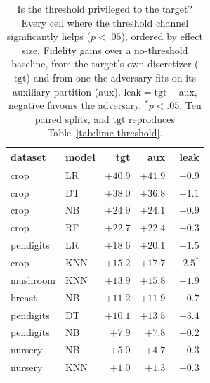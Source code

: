 \documentclass[sigconf,anonymous,review]{acmart}
\begin{document}
\begin{table}[t]
\centering
\caption{Is the threshold privileged to the target? Every cell where the threshold channel
significantly helps ($p{<}.05$), ordered by effect size. Fidelity gains over a no-threshold baseline,
from the target's own discretizer ($\text{tgt}$) and from one the adversary fits on its auxiliary
partition ($\text{aux}$). $\text{leak}=\text{tgt}-\text{aux}$, negative favours the adversary,
$^{*}p{<}.05$. Ten paired splits, and $\text{tgt}$ reproduces Table~\ref{tab:lime-threshold}.}
\label{tab:auxdisc}
\begin{tabular}{llrrr}
\toprule
dataset & model & tgt & aux & leak \\
\midrule
crop      & LR  & $+40.9$ & $+41.9$ & $-0.9$ \\
crop      & DT  & $+38.0$ & $+36.8$ & $+1.1$ \\
crop      & NB  & $+24.9$ & $+24.1$ & $+0.9$ \\
crop      & RF  & $+22.7$ & $+22.4$ & $+0.3$ \\
pendigits & LR  & $+18.6$ & $+20.1$ & $-1.5$ \\
crop      & KNN & $+15.2$ & $+17.7$ & $-2.5^{*}$ \\
mushroom  & KNN & $+13.9$ & $+15.8$ & $-1.9$ \\
breast    & NB  & $+11.2$ & $+11.9$ & $-0.7$ \\
pendigits & DT  & $+10.1$ & $+13.5$ & $-3.4$ \\
pendigits & NB  & $+7.9$  & $+7.8$  & $+0.2$ \\
nursery   & NB  & $+5.0$  & $+4.7$  & $+0.3$ \\
nursery   & KNN & $+1.0$  & $+1.3$  & $-0.3$ \\
\bottomrule
\end{tabular}
\end{table}
\end{document}
